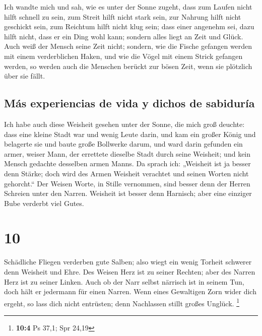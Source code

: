  Ich wandte mich und sah, wie es unter der Sonne zugeht,
dass zum Laufen nicht hilft schnell zu sein, zum Streit hilft nicht
stark sein, zur Nahrung hilft nicht geschickt sein, zum Reichtum hilft
nicht klug sein; dass einer angenehm sei, dazu hilft nicht, dass er ein
Ding wohl kann; sondern alles liegt an Zeit und Glück. 
Auch weiß der Mensch seine Zeit nicht; sondern, wie die Fische gefangen
werden mit einem verderblichen Haken, und wie die Vögel mit einem Strick
gefangen werden, so werden auch die Menschen berückt zur bösen Zeit,
wenn sie plötzlich über sie fällt.

\hypertarget{muxe1s-experiencias-de-vida-y-dichos-de-sabiduruxeda}{%
\subsection{Más experiencias de vida y dichos de
sabiduría}\label{muxe1s-experiencias-de-vida-y-dichos-de-sabiduruxeda}}

 Ich habe auch diese Weisheit gesehen unter der Sonne,
die mich groß deuchte:  dass eine kleine Stadt war und
wenig Leute darin, und kam ein großer König und belagerte sie und baute
große Bollwerke darum,  und ward darin gefunden ein
armer, weiser Mann, der errettete dieselbe Stadt durch seine Weisheit;
und kein Mensch gedachte desselben armen Manns.  Da
sprach ich: „Weisheit ist ja besser denn Stärke; doch wird des Armen
Weisheit verachtet und seinen Worten nicht gehorcht.`` 
Der Weisen Worte, in Stille vernommen, sind besser denn der Herren
Schreien unter den Narren.  Weisheit ist besser denn
Harnisch; aber eine einziger Bube verderbt viel Gutes.

\hypertarget{section-9}{%
\section{10}\label{section-9}}

 Schädliche Fliegen verderben gute Salben; also wiegt ein
wenig Torheit schwerer denn Weisheit und Ehre.  Des Weisen
Herz ist zu seiner Rechten; aber des Narren Herz ist zu seiner Linken.
 Auch ob der Narr selbst närrisch ist in seinem Tun, doch
hält er jedermann für einen Narren.  Wenn eines Gewaltigen
Zorn wider dich ergeht, so lass dich nicht entrüsten; denn Nachlassen
stillt großes Unglück. \footnote{\textbf{10:4} Ps 37,1; Spr 24,19}


